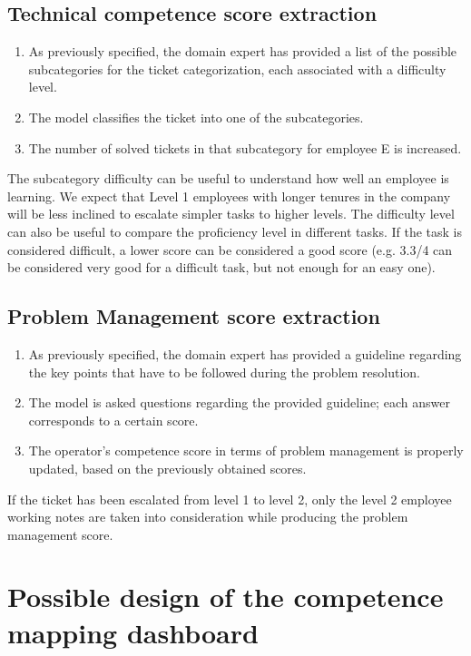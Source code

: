 \subsection{Technical competence score extraction}

\begin{enumerate}
      \item As previously specified, the domain expert has provided a list of the possible subcategories for the ticket categorization, each associated with a difficulty level.
      \item The model classifies the ticket into one of the subcategories.
      \item The number of solved tickets in that subcategory for employee E is increased.
\end{enumerate}

The subcategory difficulty can be useful to understand how well an employee is learning.
We expect that Level 1 employees with longer tenures in the company will be less inclined to escalate simpler tasks to higher levels. The difficulty level can also be useful to compare the proficiency level in different tasks. If the task is considered difficult, a lower score can be considered a good score (e.g. 3.3/4 can be considered very good for a difficult task, but not enough for an easy one).

\subsection{Problem Management score extraction}

\begin{enumerate}
      \item As previously specified, the domain expert has provided a guideline regarding the key points that have to be followed during the problem resolution.
      \item The model is asked questions regarding the provided guideline; each answer corresponds to a certain score.
      \item The operator's competence score in terms of problem management is properly updated, based on the previously obtained scores.
\end{enumerate}

If the ticket has been escalated from level 1 to level 2, only the level 2 employee working notes are taken into consideration while producing the problem management score.

\section{Possible design of the competence mapping dashboard}


